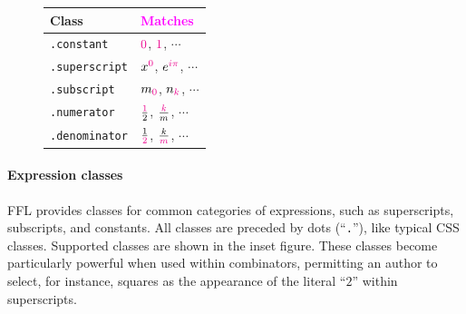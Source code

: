 {\begin{figure}
    \vspace{-1.4em}
    \hspace{1ex}
    \begin{tabularx}{.54\columnwidth}{l|l}
    \textbf{Class}   & \textcolor{magenta}{\textbf{Matches}}                                 \\\hline
    \texttt{.constant}    & $\textcolor{magenta}{0}$, $\textcolor{magenta}{1}$, $\cdots$                     \\[2pt]
    \texttt{.superscript} & $x^{\textcolor{magenta}{0}}$, $e^{\textcolor{magenta}{i\pi}}$, $\cdots$          \\[2pt]
    \texttt{.subscript}   & $m_{\textcolor{magenta}{0}}$, $n_{\textcolor{magenta}{k}}$, $\cdots$             \\[2pt]
    \texttt{.numerator}   & $\frac{\textcolor{magenta}{1}}{2}$, $\frac{\textcolor{magenta}{k}}{m}$, $\cdots$ \\[2pt]
    \texttt{.denominator} & $\frac{1}{\textcolor{magenta}{2}}$, $\frac{k}{\textcolor{magenta}{m}}$, $\cdots$ \\
    \end{tabularx}
\end{figure} } 


\paragraph{Expression classes} FFL provides classes for common categories of expressions, such as superscripts, subscripts, and constants. All classes are preceded by dots (``\texttt{.}''), like typical CSS classes. Supported classes are shown in the inset figure. These classes become particularly powerful when used within combinators, permitting an author to select, for instance, squares as the appearance of the literal ``\texttt{$2$}'' within superscripts.

